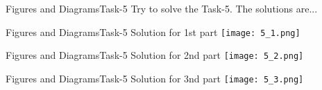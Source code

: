 \begin{frame}{Figures and Diagrams}{Task-5}
    Try to solve the Task-5. The solutions are... \\
\end{frame}

\begin{frame}{Figures and Diagrams}{Task-5 Solution for 1st part}
    \texttt{[image: 5\_1.png]}
\end{frame}

\begin{frame}{Figures and Diagrams}{Task-5 Solution for 2nd part}
    \texttt{[image: 5\_2.png]}
\end{frame}

\begin{frame}{Figures and Diagrams}{Task-5 Solution for 3nd part}
    \texttt{[image: 5\_3.png]}
\end{frame}
